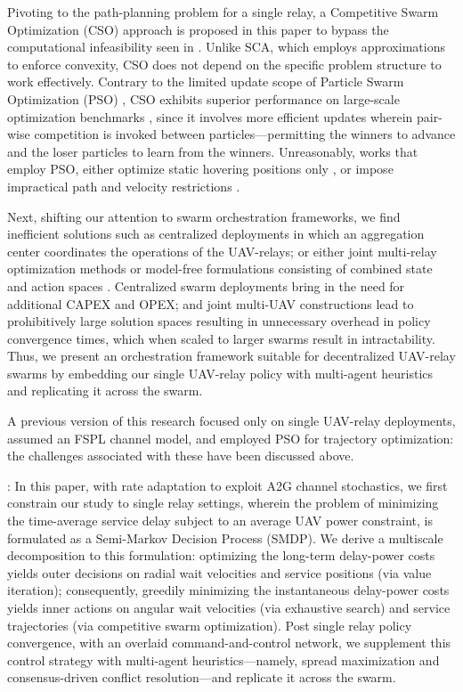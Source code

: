 \documentclass[10pt,twocolumn]{IEEEtran}
\begin{document}
Pivoting to the path-planning problem for a single relay, a Competitive Swarm Optimization (CSO) \cite{CSO} approach is proposed in this paper to bypass the computational infeasibility seen in \cite{SCA, PAoI, Rician}. Unlike SCA, which employs approximations to enforce convexity, CSO does not depend on the specific problem structure to work effectively. Contrary to the limited update scope of Particle Swarm Optimization (PSO) \cite{PSO}, CSO exhibits superior performance on large-scale optimization benchmarks \cite{CSO}, since it involves more efficient updates wherein pair-wise competition is invoked between particles---permitting the winners to advance and the loser particles to learn from the winners. Unreasonably, works that employ PSO, either optimize static hovering positions only \cite{Efficient3DPlacementPSO}, or impose impractical path and velocity restrictions \cite{PSOPathStructure, PAoI}.

Next, shifting our attention to swarm orchestration frameworks, we find inefficient solutions such as centralized deployments \cite{MultiDroneDeployment, CSCA-ADMM} in which an aggregation center coordinates the operations of the UAV-relays; or either joint multi-relay optimization methods \cite{CSCA-ADMM, UAVDynamicCoverage} or model-free formulations consisting of combined state and action spaces \cite{DDQN, MEC-DDPG}. Centralized swarm deployments bring in the need for additional CAPEX and OPEX; and joint multi-UAV constructions lead to prohibitively large solution spaces resulting in unnecessary overhead in policy convergence times, which when scaled to larger swarms result in intractability. Thus, we present an orchestration framework suitable for decentralized UAV-relay swarms by embedding our single UAV-relay policy with multi-agent heuristics and replicating it across the swarm.

A previous version of this research \cite{ICC} focused only on single UAV-relay deployments, assumed an FSPL channel model, and employed PSO for trajectory optimization: the challenges associated with these have been discussed above.

: In this paper, with rate adaptation to exploit A2G channel stochastics, we first constrain our study to single relay settings, wherein the problem of minimizing the time-average service delay subject to an average UAV power constraint, is formulated as a Semi-Markov Decision Process (SMDP). We derive a multiscale decomposition to this formulation: optimizing the long-term delay-power costs yields outer decisions on radial wait velocities and service positions (via value iteration); consequently, greedily minimizing the instantaneous delay-power costs yields inner actions on angular wait velocities (via exhaustive search) and service trajectories (via competitive swarm optimization). Post single relay policy convergence, with an overlaid command-and-control network, we supplement this control strategy with multi-agent heuristics---namely, spread maximization and consensus-driven conflict resolution---and replicate it across the swarm.
\end{document}
